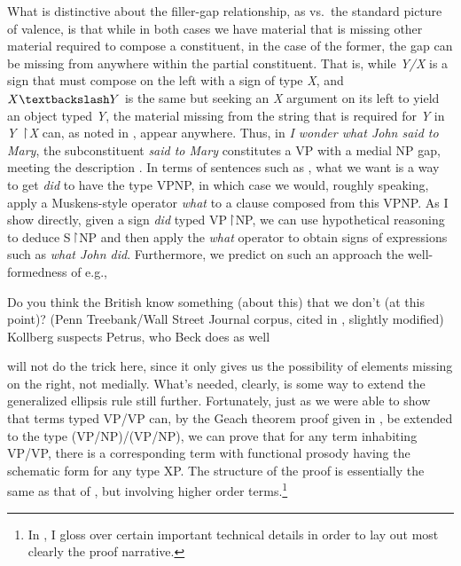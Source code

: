\documentclass[output=paper,colorlinks,citecolor=brown]{langscibook}
\begin{document}
What is distinctive about the filler-gap relationship, as vs.\  the
standard picture of valence, is that while in both cases we have material
that is missing other material required to compose a constituent, in
the case of the former, the gap can be missing from anywhere within
the partial constituent. That is, while \textit{Y/X} is a sign that must
compose on the left with a sign of type \textit{X}, and $X\bsl Y$ is the same
but seeking an \textit{X} argument on its left to yield an object typed \textit{Y},
the material missing from the string that is required for \textit{Y} in
\textit{Y} \ensuremath{\vs}\textit{X} can, as noted in , appear
anywhere. Thus, in \textit{I wonder what John said to Mary}, the
subconstituent \textit{said {\gp}\xspace to Mary} constitutes a VP with a medial NP
gap, meeting the description . In terms of sentences such as
, what we want is a way to get \textit{did} to have the type
VP\vs NP, in which case we would, roughly speaking, apply a Muskens-style
operator \textit{what} to a clause composed from this VP\vs NP. As I show
directly, given a sign \textit{did} typed VP\ensuremath{\vs}NP, we can use hypothetical
reasoning to deduce S\ensuremath{\vs}NP and then apply the \textit{what} operator to obtain
signs of expressions such as \textit{what John did}. Furthermore, we predict
on such an approach the well-formedness of e.g.,

\begin{exe}
 \ex\label{internal}
  \begin{xlist}
 \ex Do you think the British know something (about this) that we don't
(at this point)? (Penn Treebank/Wall Street Journal corpus, cited in
\citet{bos-spenader2011}, slightly modified)
 \ex Kollberg suspects Petrus, who Beck does {\gp}\xspace as well \citep[666]{kennedy1995}
  \end{xlist}
\end{exe}
 will not do the trick here, since it only gives us
the possibility of elements missing on the right, not medially. What's
needed, clearly, is some way to extend the generalized ellipsis rule
still further. Fortunately, just as we were able to show that terms
typed VP/VP can, by the Geach theorem proof given in , be
extended to the type (VP/NP)/(VP/NP), we can prove that for any term
inhabiting VP/VP, there is a corresponding term with functional
prosody having the schematic form  for any type XP.
The structure of the proof is essentially the same as that of
, but involving higher order terms.\footnote{In
, I gloss over certain important technical details in
order to lay out most clearly the proof narrative.}
\end{document}
